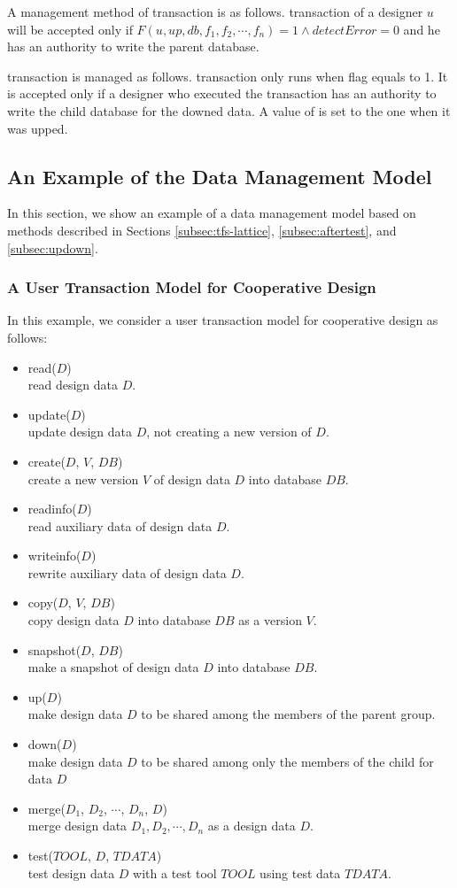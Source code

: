 A management method of \up transaction is as follows.
\up transaction of a designer $u$ will be accepted only if $F(u, up, db, f_1, f_2, 
\cdots, f_n) = 1 \wedge detectError = 0$ and he has an authority to 
write the parent database.

\down transaction is managed as follows.
\down transaction only runs when \deterr flag equals to 1.
It is accepted only if a designer who executed the \down transaction
has an authority to write the child database for the downed data.
A value of \tfs is set to the one when it was upped.

\subsection{An Example of the Data Management Model}
 \label{subsec:example}
In this section, we show an example of a data management model based on
methods described in Sections \ref{subsec:tfs-lattice},
\ref{subsec:aftertest}, and \ref{subsec:updown}.

\subsubsection{A User Transaction Model for Cooperative Design}
 \label{subsubsec:transmodel}
In this example, we consider a user transaction model for cooperative
design as follows:
\begin{itemize}
\item read($D$)\\
read design data $D$.
\item update($D$)\\
update design data $D$, not creating a new version of $D$.
\item create($D$, $V$, $DB$)\\
create a new version $V$ of design data $D$ into database $DB$.
\item readinfo($D$)\\
read auxiliary data of design data $D$.
\item writeinfo($D$)\\
rewrite auxiliary data of design data $D$.
\item copy($D$, $V$, $DB$)\\
copy design data $D$ into database $DB$ as a version $V$.
\item snapshot($D$, $DB$)\\
make a snapshot of design data $D$ into database $DB$.
\item up($D$)\\
make design data $D$ to be shared among the members of the parent 
group.
\item down($D$)\\
make design data $D$ to be shared among only the members of the
child for data $D$
\item merge($D_1$, $D_2$, $\cdots$, $D_n$, $D$)\\
merge design data $D_1, D_2, \cdots, D_n$ as a design data $D$.
\item test($TOOL$, $D$, $TDATA$)\\
test design data $D$ with a test tool $TOOL$ using test data $TDATA$.
\end{itemize}

